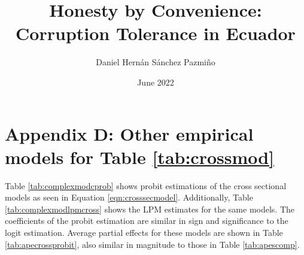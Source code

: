 \documentclass[12pt,a4]{article}
\title{Honesty by Convenience: Corruption Tolerance in Ecuador}
\author{Daniel Hernán Sánchez Pazmiño}
\date{June 2022}
\begin{document}

\section{Appendix D: Other empirical models for Table \ref{tab:crossmod}}

Table \ref{tab:complexmodcprob} shows probit estimations of the cross sectional models as seen in Equation \ref{eqn:crosssecmodel}. Additionally, Table \ref{tab:complexmodlpmcross} shows the LPM estimates for the same models. The coefficients of the probit estimation are similar in sign and significance to the logit estimation. Average partial effects for these models are shown in Table \ref{tab:apecrossprobit}, also similar in magnitude to those in Table \ref{tab:apescomp}.

\end{document}
